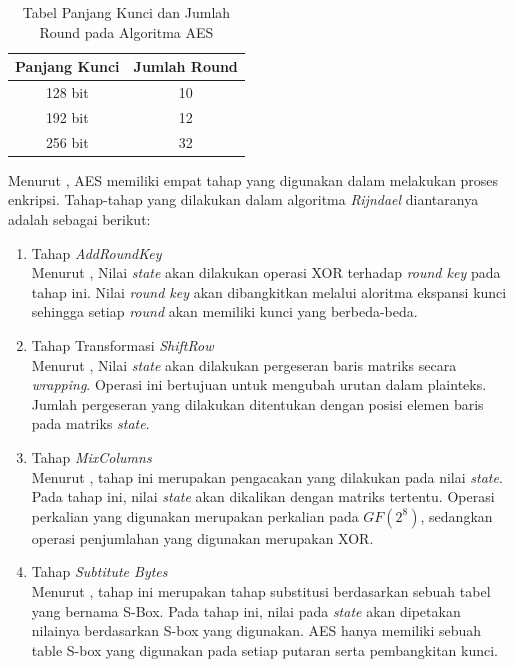 \begin{longtable}{|c|c|}
  \caption{\label{tab:aes-round} Tabel Panjang Kunci dan Jumlah Round pada Algoritma AES} \\
  \hline
  Panjang Kunci & Jumlah Round \\ \hline
  128 bit       & 10           \\ \hline
  192 bit       & 12           \\ \hline
  256 bit       & 32           \\ \hline
\end{longtable}

Menurut \textcite{staling2011}, AES memiliki empat tahap yang digunakan dalam melakukan proses enkripsi. Tahap-tahap yang dilakukan dalam algoritma \emph{Rijndael} diantaranya adalah sebagai berikut:

\begin{enumerate}
  \item Tahap \emph{AddRoundKey}\\Menurut \textcite{munir2019}, Nilai \emph{state} akan dilakukan operasi XOR terhadap \emph{round key} pada tahap ini. Nilai \emph{round key} akan dibangkitkan melalui aloritma ekspansi kunci sehingga setiap \emph{round} akan memiliki kunci yang berbeda-beda.  
  \item Tahap Transformasi \emph{ShiftRow}\\Menurut \textcite{munir2019}, Nilai \emph{state} akan dilakukan pergeseran baris matriks secara \emph{wrapping}. Operasi ini bertujuan untuk mengubah urutan dalam plainteks. Jumlah pergeseran yang dilakukan ditentukan dengan posisi elemen baris pada matriks \emph{state}.
  \item Tahap \emph{MixColumns}\\Menurut \textcite{munir2019}, tahap ini merupakan pengacakan yang dilakukan pada nilai \emph{state}. Pada tahap ini, nilai \emph{state} akan dikalikan dengan matriks tertentu. Operasi perkalian yang digunakan merupakan perkalian pada $GF(2^8)$, sedangkan operasi penjumlahan yang digunakan merupakan XOR.
  \item Tahap \emph{Subtitute Bytes}\\Menurut \textcite{munir2019}, tahap ini merupakan tahap substitusi berdasarkan sebuah tabel yang bernama S-Box. Pada tahap ini, nilai pada \emph{state} akan dipetakan nilainya berdasarkan S-box yang digunakan. AES hanya memiliki sebuah table S-box yang digunakan pada setiap putaran serta pembangkitan kunci.
\end{enumerate}

